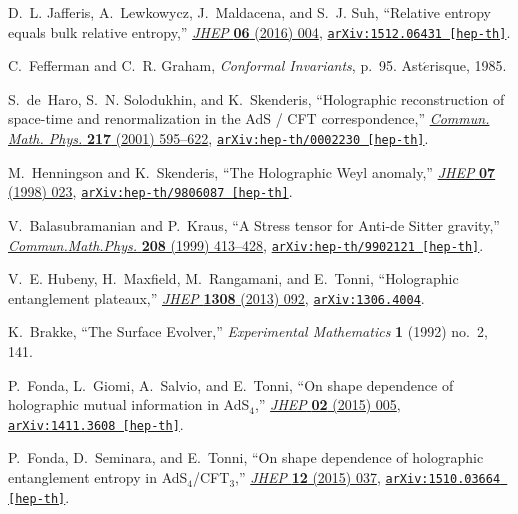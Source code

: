 \begin{thebibliography}{100}
D.~L. Jafferis, A.~Lewkowycz, J.~Maldacena, and S.~J. Suh, ``{Relative entropy
  equals bulk relative entropy},''
  \href{http://dx.doi.org/10.1007/JHEP06(2016)004}{{\em JHEP} {\bf 06} (2016)
  004},
\href{http://arxiv.org/abs/1512.06431}{{\tt arXiv:1512.06431 [hep-th]}}.

C.~Fefferman and C.~R. Graham, {\em Conformal Invariants}, p.~95.
\newblock Ast$\acute{e}$risque, 1985.

S.~de~Haro, S.~N. Solodukhin, and K.~Skenderis, ``{Holographic reconstruction
  of space-time and renormalization in the AdS / CFT correspondence},''
  \href{http://dx.doi.org/10.1007/s002200100381}{{\em Commun. Math. Phys.} {\bf
  217} (2001)  595--622},
\href{http://arxiv.org/abs/hep-th/0002230}{{\tt arXiv:hep-th/0002230
  [hep-th]}}.

M.~Henningson and K.~Skenderis, ``{The Holographic Weyl anomaly},''
  \href{http://dx.doi.org/10.1088/1126-6708/1998/07/023}{{\em JHEP} {\bf 07}
  (1998)  023},
\href{http://arxiv.org/abs/hep-th/9806087}{{\tt arXiv:hep-th/9806087
  [hep-th]}}.

V.~Balasubramanian and P.~Kraus, ``{A Stress tensor for Anti-de Sitter
  gravity},'' \href{http://dx.doi.org/10.1007/s002200050764}{{\em
  Commun.Math.Phys.} {\bf 208} (1999)  413--428},
\href{http://arxiv.org/abs/hep-th/9902121}{{\tt arXiv:hep-th/9902121
  [hep-th]}}.

V.~E. Hubeny, H.~Maxfield, M.~Rangamani, and E.~Tonni, ``{Holographic
  entanglement plateaux},''
  \href{http://dx.doi.org/10.1007/JHEP08(2013)092}{{\em JHEP} {\bf 1308} (2013)
   092},
\href{http://arxiv.org/abs/1306.4004}{{\tt arXiv:1306.4004}}.

K.~Brakke, ``{The Surface Evolver},'' {\em Experimental Mathematics} {\bf 1}
  (1992) no.~2, 141.

P.~Fonda, L.~Giomi, A.~Salvio, and E.~Tonni, ``{On shape dependence of
  holographic mutual information in AdS$_{4}$},''
  \href{http://dx.doi.org/10.1007/JHEP02(2015)005}{{\em JHEP} {\bf 02} (2015)
  005},
\href{http://arxiv.org/abs/1411.3608}{{\tt arXiv:1411.3608 [hep-th]}}.

P.~Fonda, D.~Seminara, and E.~Tonni, ``{On shape dependence of holographic
  entanglement entropy in AdS$_{4}$/CFT$_{3}$},''
  \href{http://dx.doi.org/10.1007/JHEP12(2015)037}{{\em JHEP} {\bf 12} (2015)
  037},
\href{http://arxiv.org/abs/1510.03664}{{\tt arXiv:1510.03664 [hep-th]}}.


\end{thebibliography}
